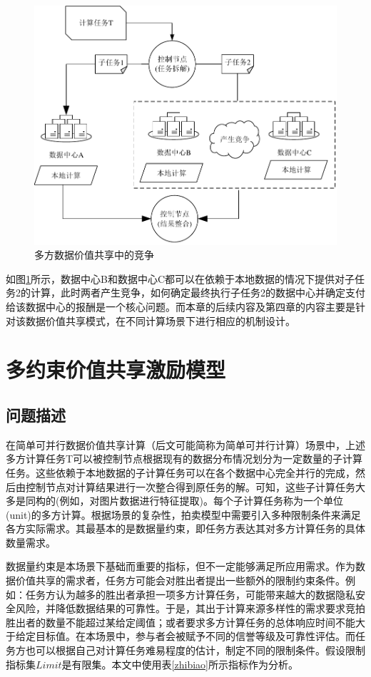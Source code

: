 \documentclass[promaster]{thesis-uestc}
\begin{document}
\begin{figure}[h]   
\includegraphics{pic/yuanweijili.pdf}
\caption{多方数据价值共享中的竞争}
\label{yuanweijili}
\end{figure}

如图\ref{yuanweijili}所示，数据中心B和数据中心C都可以在依赖于本地数据的情况下提供对子任务2的计算，此时两者产生竞争，如何确定最终执行子任务2的数据中心并确定支付给该数据中心的报酬是一个核心问题。而本章的后续内容及第四章的内容主要是针对该数据价值共享模式，在不同计算场景下进行相应的机制设计。

\section{多约束价值共享激励模型}

\subsection{问题描述}

在简单可并行数据价值共享计算（后文可能简称为简单可并行计算）场景中，上述多方计算任务T可以被控制节点根据现有的数据分布情况划分为一定数量的子计算任务。这些依赖于本地数据的子计算任务可以在各个数据中心完全并行的完成，然后由控制节点对计算结果进行一次整合得到原任务的解。可知，这些子计算任务大多是同构的(例如，对图片数据进行特征提取)。每个子计算任务称为一个单位(unit)的多方计算。根据场景的复杂性，拍卖模型中需要引入多种限制条件来满足各方实际需求。其最基本的是数据量约束，即任务方表达其对多方计算任务的具体数量需求。

数据量约束是本场景下基础而重要的指标，但不一定能够满足所应用需求。作为数据价值共享的需求者，任务方可能会对胜出者提出一些额外的限制约束条件。例如：任务方认为越多的胜出者承担一项多方计算任务，可能带来越大的数据隐私安全风险，并降低数据结果的可靠性。于是，其出于计算来源多样性的需求要求竞拍胜出者的数量不能超过某给定阈值；或者要求多方计算任务的总体响应时间不能大于给定目标值。在本场景中，参与者会被赋予不同的信誉等级及可靠性评估。而任务方也可以根据自己对计算任务难易程度的估计，制定不同的限制条件。假设限制指标集$Limit$是有限集。本文中使用表\ref{zhibiao}所示指标作为分析。
\end{document}
